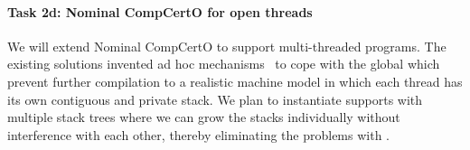 \vspace*{-2ex}
\paragraph*{Task 2d: Nominal CompCertO for open threads}
We will extend Nominal CompCertO to support
multi-threaded programs. The existing solutions invented ad hoc
mechanisms~\cite{ccal18} to cope with the global \nextblock which
prevent further compilation to a realistic machine model in which each
thread has its own contiguous and private stack. We plan to
instantiate supports with multiple stack trees where we can grow
the stacks individually without interference with each other, thereby
eliminating the problems with \nextblock.



